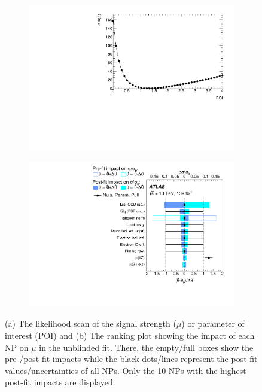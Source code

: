 \begin{figure}[!h] 
  \begin{subfigure}[b]{0.49\linewidth}
    \centering
    \includegraphics[width=\textwidth]{ubonn-thesis/Chapters/Chapters_07/Figure/Data/NLLscan_POI.pdf}
    \caption{}
    \label{fig:dataNLL}
  \end{subfigure}%
  \begin{subfigure}[b]{0.49\linewidth}
    \centering
    \hspace*{0.4cm}
    \includegraphics[width=\textwidth]{ubonn-thesis/Chapters/Chapters_07/Figure/Data/RankingSysts_POI_systs.pdf}
   \caption{}
   \label{fig:datarank}
  \end{subfigure}
  \caption{(a) The likelihood scan of the signal strength ($\mu$) or parameter of interest (POI) and (b) The ranking plot showing the impact of each NP on $\mu$ in the unblinded fit. There, the empty/full boxes show the pre-/post-fit impacts while the black dots/lines represent the post-fit values/uncertainties of all NPs. Only the 10 NPs with the highest post-fit impacts are displayed. }
\end{figure}

